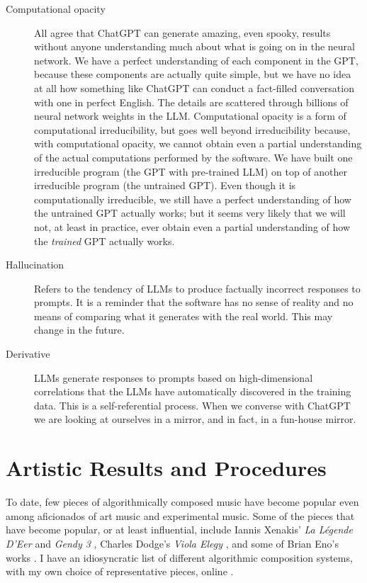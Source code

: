 \documentclass[11pt]{amsart}
\begin{document}
\begin{description}
\item[Computational opacity] All agree that ChatGPT can generate amazing, even spooky, results without anyone understanding much about what is going on in the neural network. We have a perfect understanding of each component in the GPT, because these components are actually quite simple, but we have no idea at all how something like ChatGPT can conduct a fact-filled conversation with one in perfect English. The details are scattered through billions of neural network weights in the LLM. Computational opacity is a form of computational irreducibility, but goes well beyond irreducibility because, with computational opacity, we cannot obtain even a partial understanding of the actual computations performed by the software. We have built one irreducible program (the GPT with pre-trained LLM) on top of another irreducible program (the untrained GPT). Even though it is computationally irreducible, we still have a perfect understanding of how the untrained GPT actually works; but it seems very likely that we will not, at least in practice, ever obtain even a partial understanding of how the  \emph{trained} GPT actually works.
\item [Hallucination] Refers to the tendency of LLMs to produce factually incorrect responses to prompts. It is a reminder that the software has no sense of reality and no means of comparing what it generates with the real world. This may change in the future.
\item [Derivative] LLMs generate responses to prompts based on high-dimensional correlations that the LLMs have automatically discovered in the training data. This is a self-referential process. When we converse with ChatGPT we are looking at ourselves in a mirror, and in fact, in a fun-house mirror.
\end{description}

\section{Artistic Results and Procedures}

To date, few pieces of algorithmically composed music have become popular even among aficionados of art music and experimental music. Some of the pieces that have become popular, or at least influential, include Iannis Xenakis' \emph{La Légende D'Eer} \cite{Solr-8143160} and \emph{Gendy 3} \cite{gendy3},  Charles Dodge's \emph{Viola Elegy} \cite{violaelegy}, and some of Brian Eno's works \cite{eno1996generative, enochilvers}. I have an idiosyncratic list of different algorithmic composition systems, with my own choice of representative pieces, online \cite{rant}.
\end{document}
